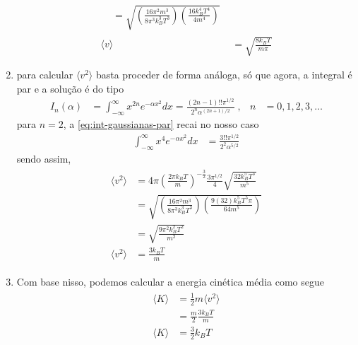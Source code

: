 \begin{prob}
\begin{sol}
\begin{enumerate}[label=\alph *)]
\begin{align}
\begin{split}
					&=\sqrt{\left(\frac{16\pi^2m^3}{8\pi^3k_B^3T^3}\right)\left(\frac{16k_B^4T^4}{4m^4}\right)}
				\end{split}\\
				\langle v \rangle&=\sqrt{\frac{8k_BT}{m\pi}}
			\end{align}
			\item para calcular $\langle v^2 \rangle$ basta proceder de forma análoga, só que agora, a integral é par e a solução é do tipo
			\begin{align}
				\label{eq:int-gaussianas-par}
				I_n(\alpha)&=\int_{-\infty}^{\infty}x^{2n}e^{-\alpha x^2}dx=\frac{(2n-1)!!\pi^{1/2}}{2^n\alpha^{(2n+1)/2}}\;, & n&=0,1,2,3,\ldots
			\end{align}
			para $n=2$, a \eqref{eq:int-gaussianas-par} recai no nosso caso
			\begin{align}
				\int_{-\infty}^{\infty}x^{4}e^{-\alpha x^2}dx&=\frac{3!!\pi^{1/2}}{2^2\alpha^{5/2}}
			\end{align}
			sendo assim,
			\begin{align}
				\begin{split}
					\langle v^2 \rangle&=4\pi\left(\frac{2\pi k_BT}{m}\right)^{-\frac{3}{2}}\frac{3\pi^{1/2}}{4}\sqrt{\frac{32k_B^5T^5}{m^5}}\\
					&=\sqrt{\left(\frac{16\pi^2m^3}{8\pi^3k_B^3T^3}\right)\left(\frac{9(32)k_B^5T^5\pi}{64m^5}\right)}\\
					&=\sqrt{\frac{9\pi^2k_B^2T^2}{m^2}}\\
					\langle v^2 \rangle&=\frac{3 k_BT}{m}
				\end{split}
			\end{align}
			\item Com base nisso, podemos calcular a energia cinética média como segue
			\begin{align}
				\begin{split}
					\langle K \rangle&=\frac{1}{2}m\langle v^2 \rangle\\
					&=\frac{m}{2}\frac{3 k_BT}{m}\\
					\langle K \rangle&=\frac{3}{2}k_BT
				\end{split}
			\end{align}
		\end{enumerate}
	\end{sol}
\end{prob}

